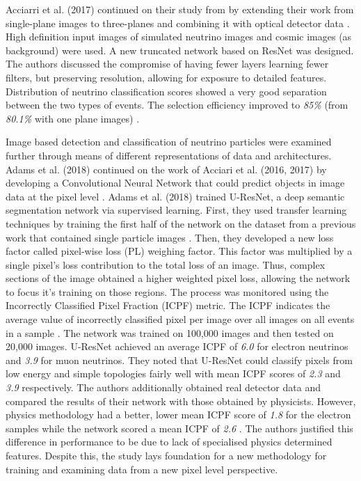 Acciarri et al. (2017) continued on their study from \cite{acciarri2017convolutional} by extending their work from single-plane images to three-planes and combining it with optical detector data \cite{collaboration2016convolutional}. High definition input images of simulated neutrino images and cosmic images (as background) were used. A new truncated network based on ResNet was designed. The authors discussed the compromise of having fewer layers learning fewer filters, but preserving resolution, allowing for exposure to detailed features. Distribution of neutrino classification scores showed a very good separation between the two types of events. The selection efficiency improved to \textit{85\%} (from \textit{80.1\%} with one plane images) \cite{collaboration2016convolutional}.

Image based detection and classification of neutrino particles were examined further through means of different representations of data and architectures. Adams et al. (2018) continued on the work of Acciari et al. (2016, 2017) by developing a Convolutional Neural Network that could predict objects in image data at the pixel level \cite{collaboration2019deep}. Adams et al. (2018) trained U-ResNet, a deep semantic segmentation network via supervised learning. First, they used transfer learning techniques by training the first half of the network on the dataset from a previous work that contained single particle images \cite{acciarri2017convolutional}. Then, they developed a new loss factor called pixel-wise loss (PL) weighing factor. This factor was multiplied by a single pixel's loss contribution to the total loss of an image. Thus, complex sections of the image obtained a higher weighted pixel loss, allowing the network to focus it's training on those regions. The process was monitored using the Incorrectly Classified Pixel Fraction (ICPF) metric. The ICPF indicates the average value of incorrectly classified pixel per image over all images on all events in a sample \cite{zhang2008new}. The network was trained on 100,000 images and then tested on 20,000 images. U-ResNet achieved an average ICPF of \textit{6.0} for electron neutrinos and \textit{3.9} for muon neutrinos. They noted that U-ResNet could classify pixels from low energy and simple topologies fairly well with mean ICPF scores of \textit{2.3} and \textit{3.9} respectively. The authors additionally obtained real detector data and compared the results of their network with those obtained by physicists. However, physics methodology had a better, lower mean ICPF score of \textit{1.8} for the electron samples while the network scored a mean ICPF of \textit{2.6} \cite{collaboration2019deep}. The authors justified this difference in performance to be due to lack of specialised physics determined features. Despite this, the study lays foundation for a new methodology for training and examining data from a new pixel level perspective.

